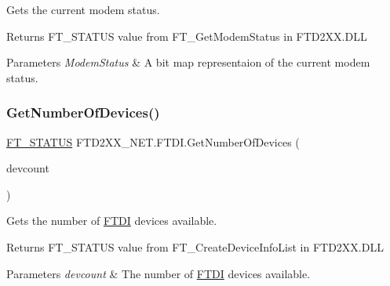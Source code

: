 Gets the current modem status. 

\begin{DoxyReturn}{Returns}
F\+T\+\_\+\+S\+T\+A\+T\+US value from F\+T\+\_\+\+Get\+Modem\+Status in F\+T\+D2\+X\+X.\+D\+LL
\end{DoxyReturn}

\begin{DoxyParams}{Parameters}
{\em Modem\+Status} & A bit map representaion of the current modem status.\\
\hline
\end{DoxyParams}
\mbox{\label{class_f_t_d2_x_x___n_e_t_1_1_f_t_d_i_a6678e4b06be462ec26ff78b57f9cbdab}} 
\subsubsection{\texorpdfstring{GetNumberOfDevices()}{GetNumberOfDevices()}}
{\footnotesize\ttfamily \mbox{\hyperlink{class_f_t_d2_x_x___n_e_t_1_1_f_t_d_i_aabe20ad905cc4ccc1e35dd5b877d9a83}{F\+T\+\_\+\+S\+T\+A\+T\+US}} F\+T\+D2\+X\+X\+\_\+\+N\+E\+T.\+F\+T\+D\+I.\+Get\+Number\+Of\+Devices (\begin{DoxyParamCaption}\item[{ref U\+Int32}]{devcount }\end{DoxyParamCaption})}



Gets the number of \mbox{\hyperlink{class_f_t_d2_x_x___n_e_t_1_1_f_t_d_i}{F\+T\+DI}} devices available. 

\begin{DoxyReturn}{Returns}
F\+T\+\_\+\+S\+T\+A\+T\+US value from F\+T\+\_\+\+Create\+Device\+Info\+List in F\+T\+D2\+X\+X.\+D\+LL
\end{DoxyReturn}

\begin{DoxyParams}{Parameters}
{\em devcount} & The number of \mbox{\hyperlink{class_f_t_d2_x_x___n_e_t_1_1_f_t_d_i}{F\+T\+DI}} devices available.\\
\hline
\end{DoxyParams}
\mbox{\label{class_f_t_d2_x_x___n_e_t_1_1_f_t_d_i_acff618b6dc97a27a1d5fb0554c945f61}} 

